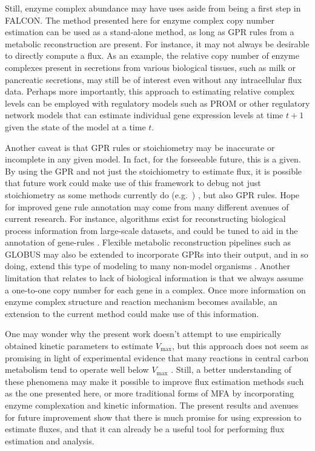 Still, enzyme complex abundance may have uses aside from being a first
step in FALCON. The method presented here for enzyme complex copy
number estimation can be used as a stand-alone method, as long as GPR
rules from a metabolic reconstruction are present. For instance, it
may not always be desirable to directly compute a flux. As an example,
the relative copy number of enzyme complexes present in secretions
from various biological tissues, such as milk or pancreatic
secretions, may still be of interest even without any intracellular
flux data.  Perhaps more importantly, this approach to estimating
relative complex levels can be employed with regulatory models such as
PROM \citep{Chandrasekaran2010a} or other regulatory network models
that can estimate individual gene expression levels at time $t+1$
given the state of the model at a time $t$.

Another caveat is that GPR rules or stoichiometry may be inaccurate or
incomplete in any given model. In fact, for the forseeable future,
this is a given. By using the GPR and not just the stoichiometry to
estimate flux, it is possible that future work could make use of this
framework to debug not just stoichiometry as some methods currently do
(e.g.\ \citealt{Reed14112006}) , but also GPR rules.  Hope for
improved gene rule annotation may come from many different avenues of
current research. For instance, algorithms exist for reconstructing
biological process information from large-scale datasets, and could be
tuned to aid in the annotation of gene-rules
\citep{Mitra2013}. Flexible metabolic reconstruction pipelines such as
GLOBUS may also be extended to incorporate GPRs into their output, and
in so doing, extend this type of modeling to many non-model organisms
\citep{Plata2012}.  Another limitation that relates to lack of
biological information is that we always assume a one-to-one copy
number for each gene in a complex. Once more information on enzyme
complex structure and reaction mechanism becomes available, an
extension to the current method could make use of this information.


One may wonder why the present work doesn't attempt to use empirically
obtained kinetic parameters to estimate $V_{\max}$, but this approach
does not seem as promising in light of experimental evidence that many
reactions in central carbon metabolism tend to operate well below
$V_{\max}$ \citep{Bennett2009}. Still, a better understanding of these
phenomena may make it possible to improve flux estimation methods such
as the one presented here, or more traditional forms of MFA
\citep{Shestov2013a} by incorporating enzyme complexation and kinetic
information. The present results and avenues for future improvement
show that there is much promise for using expression to estimate
fluxes, and that it can already be a useful tool for performing flux
estimation and analysis.


